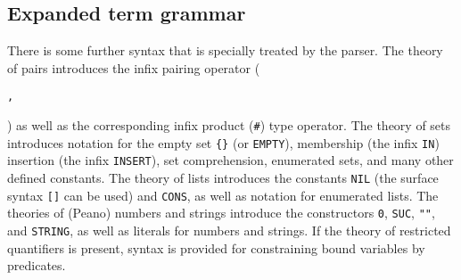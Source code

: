 \documentclass[12pt,fleqn,layout,a4paper]{report}
\begin{document}
\subsection{Expanded term grammar}

There is some further syntax that is specially treated by the
 parser. The theory of pairs introduces the infix pairing operator
 (\begin{Large}\verb+,+\end{Large}) as well as the corresponding infix
 product (\verb+#+) type operator. The theory of sets introduces
 notation for the empty set \verb+{}+ (or \verb+EMPTY+), membership (the
 infix \verb+IN+) insertion (the infix \verb+INSERT+), set
 comprehension, enumerated sets, and many other defined constants. The
 theory of lists introduces the constants \verb+NIL+ (the surface syntax
 \verb+[]+ can be used) and \verb+CONS+, as well as notation for
 enumerated lists. The theories of (Peano) numbers and strings introduce
 the constructors \verb+0+, \verb+SUC+, \verb+""+, and \verb+STRING+, as
 well as literals for numbers and strings. If the theory of restricted
 quantifiers is present, syntax is provided for constraining bound
 variables by predicates.
\end{document}
